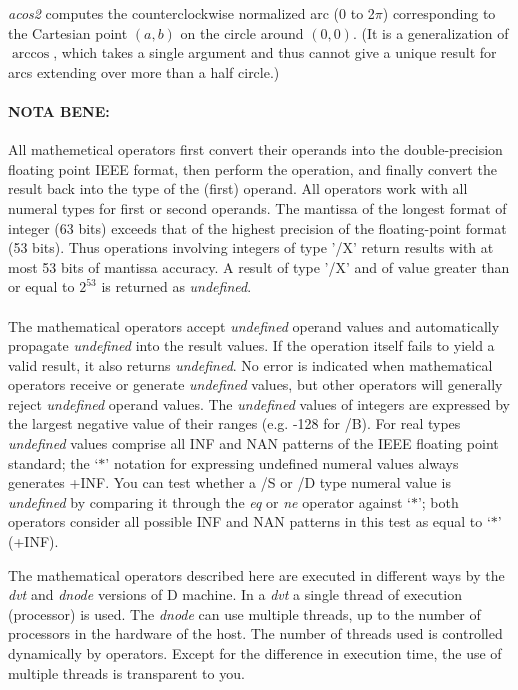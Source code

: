 \emph{acos2 } computes the counterclockwise normalized arc (0 to 2$\pi$) corresponding to the Cartesian point $(a,b)$ on the circle around $(0,0)$. (It is a generalization of $\arccos$, which takes a single argument and thus cannot give a unique result for arcs extending over more than a half circle.)

\paragraph{NOTA BENE: }All mathemetical operators first convert their operands into the double-precision floating point IEEE format, then perform the operation, and finally convert the result back into the type of the (first) operand. All operators work with all numeral types for first or second operands. The mantissa of the longest format of integer (63 bits) exceeds that of the highest precision of the floating-point format (53 bits). Thus operations involving integers of type '/X' return results with at most 53 bits of mantissa accuracy. A result of type '/X' and of value greater than or equal to $2^{53}$ is returned as \emph{undefined}.\\\\


The   mathematical   operators  accept  \emph{undefined} operand values and automatically propagate \emph{undefined} into the result values. If the operation itself fails to yield a valid result,  it also returns \emph{undefined}. No error is indicated when mathematical operators receive or generate \emph{undefined} values, but other operators will generally reject \emph{undefined} operand values. The \emph{undefined} values of integers are expressed by the largest negative value of their ranges (e.g. -128 for /B). For real types \emph{undefined} values comprise all INF and NAN patterns of the IEEE floating point standard; the `$\ast$' notation for expressing undefined numeral values always generates +INF. You can test whether a /S or /D type numeral value is \emph{undefined} by comparing it through the \emph{eq} or \emph{ne} operator against `$\ast$'; both operators consider all possible INF and NAN patterns in this test as equal to `$\ast$' (+INF).

The mathematical operators described here are executed in different ways by the \emph{dvt} and \emph{dnode} versions of D machine. In a \emph{dvt} a single thread of execution (processor) is used. The \emph{dnode} can use multiple threads, up to the number of processors in the hardware of the host. The number of threads used is controlled dynamically by operators. Except for the difference in execution time, the use of multiple threads is transparent to you.


